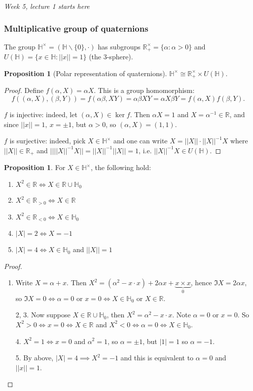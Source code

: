 \documentclass[a4paper]{article}
\newcommand{\R}{\mathbb{R}}
\newcommand{\Hq}{\mathbb{H}}
\theoremstyle{definition}
\newtheorem{prop}[defn]{Proposition}
\begin{document}
\begin{flushright}
\textit{Week 5, lecture 1 starts here}
\end{flushright}

\subsubsection{Multiplicative group of quaternions}

The group $\Hq^\times=(\Hq\backslash\{0\},\cdot)$ has subgroups $\R_+^\times=\{\alpha:\alpha>0\}$ and $U(\Hq)=\{x\in\Hq:||x||=1\}$ (the 3-sphere).

\begin{prop}[Polar representation of quaternions]
$\Hq^\times\cong \R_+^\times\times U(\Hq)$.
\end{prop}
\begin{proof}
Define $f(\alpha,X)=\alpha X$. This is a group homomorphism:
\[
f((\alpha,X),(\beta,Y))=f(\alpha\beta,XY)=\alpha\beta XY=\alpha X\beta Y=f(\alpha,X)f(\beta,Y).
\]

$f$ is injective: indeed, let $(\alpha,X)\in\ker f$. Then $\alpha X=1$ and $X=\alpha^{-1}\in\R$, and since $||x||=1,\ x=\pm 1$, but $\alpha>0$, so $(\alpha,X)=(1,1)$.

$f$ is surjective: indeed, pick $X\in\Hq^\times$ and one can write $X=||X||\cdot ||X||^{-1}X$ where $||X||\in\R_+$ and $||||X||^{-1}X||=||X||^{-1}||X||=1$, i.e. $||X||^{-1}X\in U(\Hq)$.
\end{proof}

\begin{prop}
For $X\in\Hq^\times$, the following hold:
\begin{enumerate}
\item $X^2\in\R\iff X\in \R\cup\Hq_0$
\item $X^2\in\R_{>0}\iff X\in\R$
\item $X^2\in\R_{<0}\iff X\in\Hq_0$
\item $|X|=2\iff X=-1$
\item $|X|=4\iff X\in\Hq_0$ and $||X||=1$
\end{enumerate}
\end{prop}
\begin{proof}
\begin{enumerate}
\item Write $X=\alpha+x$. Then $X^2=(\alpha^2-x\cdot x)+2\alpha x+\underbrace{x\times x}_0$, hence $\Im X=2\alpha x$, so $\Im X=0\iff\alpha=0$ or $x=0\iff X\in\Hq_0$ or $X\in\R$.
\item[2, 3.] Now suppose $X\in\R\cup\Hq_0$, then $X^2=\alpha^2-x\cdot x$. Note $\alpha=0$ or $x=0$. So $X^2>0\iff x=0\iff X\in\R$ and $X^2<0\iff \alpha=0\iff X\in\Hq_0$.
\item[4.] $X^2=1\iff x=0$ and $\alpha^2=1$, so $\alpha=\pm 1$, but $|1|=1$ so $\alpha=-1$.
\item[5.] By above, $|X|=4\implies X^2=-1$ and this is equivalent to $\alpha=0$ and $||x||=1$.
\end{enumerate}
\end{proof}
\end{document}
